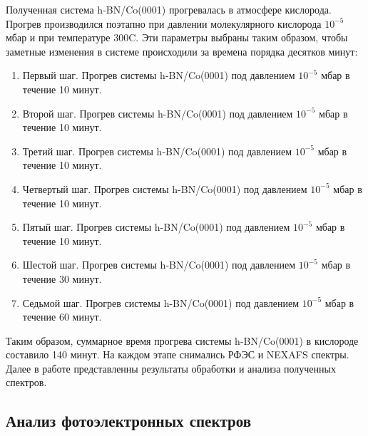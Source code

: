 Полученная система h-BN/Co(0001) прогревалась в атмосфере
кислорода. Прогрев производился поэтапно при давлении молекулярного кислорода $10^{-5}$ мбар и при температуре 300\degree C. Эти параметры выбраны 
таким образом, чтобы заметные изменения в системе происходили за времена
порядка десятков минут:
	\vspace{15pt}
		\begin{enumerate}
			\item Первый шаг. Прогрев системы h-BN/Co(0001) под давлением $10^{-5}$ мбар в течение 10 минут.
			\item Второй шаг. Прогрев системы h-BN/Co(0001) под давлением $10^{-5}$ мбар в течение 10 минут.
			\item Третий шаг. Прогрев системы h-BN/Co(0001) под давлением $10^{-5}$ мбар в течение 10 минут.
			\item Четвертый шаг. Прогрев системы h-BN/Co(0001) под давлением $10^{-5}$ мбар в течение 10 минут.
			\item Пятый шаг. Прогрев системы h-BN/Co(0001) под давлением $10^{-5}$ мбар в течение 10 минут.
			\item Шестой шаг. Прогрев системы h-BN/Co(0001) под давлением $10^{-5}$ мбар в течение 30 минут.
			\item Седьмой шаг. Прогрев системы h-BN/Co(0001) под давлением $10^{-5}$ мбар в течение 60 минут.
		\end{enumerate}
	\vspace{15pt}
Таким образом, суммарное время прогрева системы h-BN/Co(0001) в кислороде составило 140 минут.
На каждом этапе снимались РФЭС и NEXAFS спектры.
Далее в работе представленны результаты обработки и анализа полученных спектров.



\subsection{Анализ фотоэлектронных спектров}

